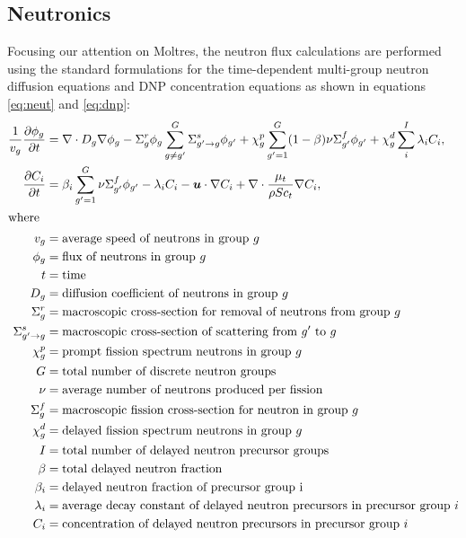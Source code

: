 \subsection{Neutronics}

Focusing our attention on Moltres, the neutron flux calculations are
performed using the standard formulations for the time-dependent multi-group
neutron diffusion equations and \gls{DNP} concentration equations as shown in
equations \ref{eq:neut} and \ref{eq:dnp}:
%
\begin{align}
	\frac{1}{v_g} \frac{\partial \phi_g}{\partial t} &= \nabla \cdot D_g
	\nabla \phi_g - \Sigma^r_g \phi_g
	\sum^G_{g \neq g'} \Sigma^s_{g' \rightarrow g} \phi_{g'} + \chi^p_g
	\sum^G_{g'=1} (1-\beta) \nu \Sigma^f_{g'} \phi_{g'} + \chi^d_g \sum^I_i
	\lambda_i C_i, \label{eq:neut} \\
	\frac{\partial C_i}{\partial t} &= \beta_i \sum^G_{g'=1} \nu \Sigma^f_{g'}
	\phi_{g'} - \lambda_i C_i - \boldsymbol{u} \cdot \nabla C_i + \nabla \cdot
	\frac{\mu_t}{\rho Sc_t} \nabla C_i, \label{eq:dnp} \\
	\intertext{where} v_g &= \text{average speed of neutrons in group }g 
	\nonumber \\
	\phi_g &= \text{flux of neutrons in group }g \nonumber \\
	t &= \text{time} \nonumber \\
	D_g &= \text{diffusion coefficient of neutrons in group }g \nonumber \\
	\Sigma^r_g &= \text{macroscopic cross-section for removal of neutrons from
	group }g \nonumber \\
	\Sigma^s_{g' \rightarrow g} &= \text{macroscopic cross-section of
	scattering from }g' \text{ to }g \nonumber \\
	\chi^p_g &= \text{prompt fission spectrum neutrons in group }g \nonumber
	\\
	G &= \text{total number of discrete neutron groups} \nonumber \\
	\nu &= \text{average number of neutrons produced per fission} \nonumber \\
	\Sigma^f_{g} &= \text{macroscopic fission cross-section for neutron in
	group }g \nonumber \\
	\chi^d_g &= \text{delayed fission spectrum neutrons in group }g \nonumber
	\\
	I &= \text{total number of delayed neutron precursor groups} \nonumber \\
	\beta &= \text{total delayed neutron fraction} \nonumber \\
	\beta_i &= \text{delayed neutron fraction of precursor group i} \nonumber
	\\
	\lambda_i &= \text{average decay constant of delayed neutron precursors in
	precursor group }i \nonumber \\
	C_i &= \text{concentration of delayed neutron precursors in precursor
	group }i \nonumber
\end{align}
%

